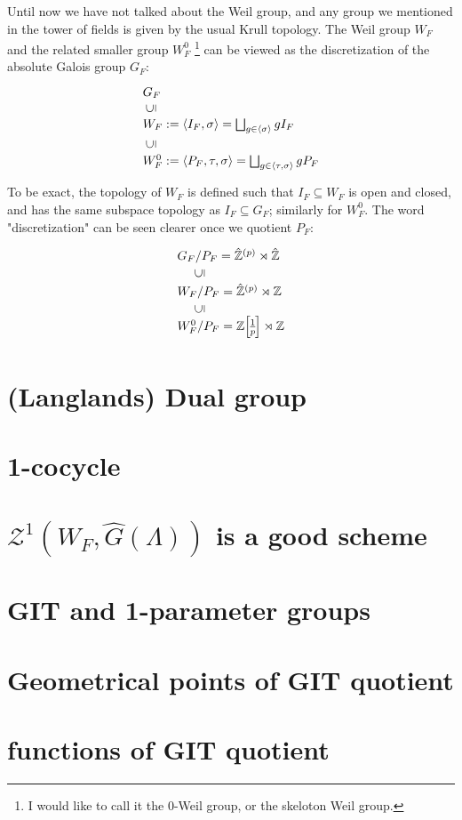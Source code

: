 \documentclass[reqno,11pt]{amsart}
\numberwithin{equation}{section}
\theoremstyle{plain}
\theoremstyle{plain}
\numberwithin{equation}{section}
\theoremstyle{remark}
\newcommand{\zdivp}{\mathbb{Z}\!\left[\hspace{-0.5mm}\frac{1}{p}\hspace{-0.5mm}\right]}
\begin{document}
Until now we have not talked about the Weil group, and any group we mentioned in the tower of fields is given by the usual Krull topology. The Weil group $W_F$ and the related smaller group $W_F^0$ \footnote{I would like to call it the $0$-Weil group, or the skeloton Weil group.} can be viewed as the discretization of the absolute Galois group $G_F$:
\[\begin{tikzcd}[%
    row sep = -1mm
    ,/tikz/column 1/.append style={anchor=base west}
    ]
	{G_F} \\
	\;\rotatebox{90}{$\subseteq$}\\
	{W_F:=\left< I_F,\sigma \right> = \bigsqcup_{g \in \left<\sigma\right>} gI_F} \\
	\;\rotatebox{90}{$\subseteq$}\\	
	{W_F^0:=\left< P_F,\tau, \sigma \right> = \bigsqcup_{g \in \left<\tau,\sigma\right>} gP_F}
\end{tikzcd}\]
To be exact, the topology of $W_F$ is defined such that $I_F \subseteq W_F$ is open and closed, and has the same subspace topology as $I_F \subseteq G_F$; similarly for $W_F^0$. The word "discretization" can be seen clearer once we quotient $P_F$:
\[\begin{tikzcd}[%
    row sep = -1mm
    ,/tikz/column 1/.append style={anchor=base west}
    ]
	{G_F/P_F=\hat{\mathbb{Z}}^{(p)} \rtimes {\hat{\mathbb{Z}}}} \\
	\hspace{5mm}\rotatebox{90}{$\subseteq$}\\
	{W_F/P_F=\hat{\mathbb{Z}}^{(p)} \rtimes \mathbb{Z}} \\
	\hspace{5mm}\rotatebox{90}{$\subseteq$}\\[-1mm]	
	{W_F^0/P_F=\zdivp \rtimes \mathbb{Z}}
\end{tikzcd}\]
\section{(Langlands) Dual group}
\section{1-cocycle}
\section{$\mathcal{Z}^1(W_F,\hat{G}(\Lambda))$ is a good scheme}
\section{GIT and 1-parameter groups}
\section{Geometrical points of GIT quotient}
\section{functions of GIT quotient}



\end{document}
